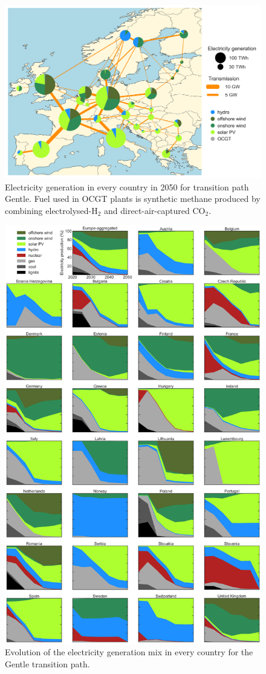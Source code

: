 \documentclass[3p]{elsarticle} %
\begin{document}

\begin{figure}[!h]
\centering
\includegraphics[width=0.8\columnwidth]{../figures/spatial_electricity_generation_Base.png}
\caption{Electricity generation in every country in 2050 for transition path Gentle. Fuel used in OCGT plants is synthetic methane produced by combining electrolysed-H$_2$ and direct-air-captured CO$_2$.} \label{fig_spatial_plot} 
\end{figure}
\clearpage

\begin{figure}[!h]
\centering
\includegraphics[width=0.8\columnwidth]{../figures/electricity_production_Base_go.png}
\caption{Evolution of the electricity generation mix in every country for the Gentle transition path.} \label{fig_primary_energy} 
\end{figure}
\clearpage
\end{document}
